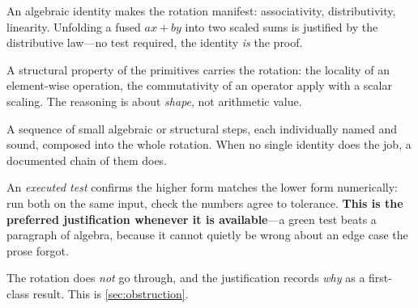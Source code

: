 \begin{description}[leftmargin=2.2em,style=nextline]
  \item[\texttt{algebraic}.] An algebraic identity makes the rotation manifest:
  associativity, distributivity, linearity. Unfolding a fused $a x + b y$ into two
  scaled sums is justified by the distributive law---no test required, the
  identity \emph{is} the proof.

  \item[\texttt{structural}.] A structural property of the primitives carries the
  rotation: the locality of an element-wise operation, the commutativity of an
  operator apply with a scalar scaling. The reasoning is about \emph{shape}, not
  arithmetic value.

  \item[\texttt{reduction\_chain}.] A sequence of small algebraic or structural
  steps, each individually named and sound, composed into the whole rotation. When
  no single identity does the job, a documented chain of them does.

  \item[\texttt{empirical\_match}.] An \emph{executed test} confirms the higher
  form matches the lower form numerically: run both on the same input, check the
  numbers agree to tolerance. \textbf{This is the preferred justification whenever
  it is available}---a green test beats a paragraph of algebra, because it cannot
  quietly be wrong about an edge case the prose forgot.

  \item[\texttt{obstruction}.] The rotation does \emph{not} go through, and the
  justification records \emph{why} as a first-class result. This is
  \cref{sec:obstruction}.
\end{description}

